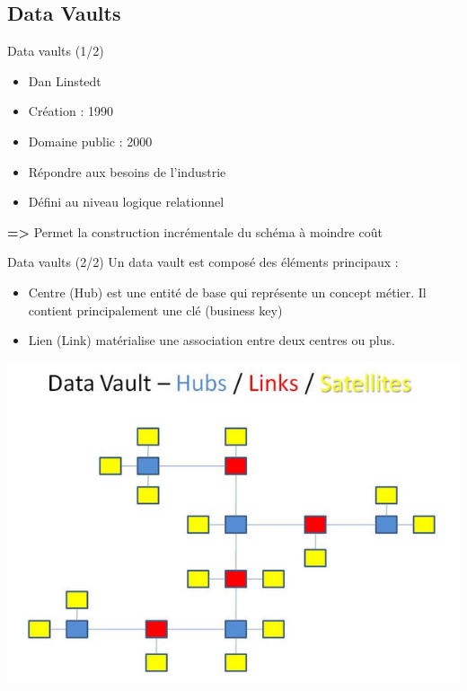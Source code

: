 \subsection{Data Vaults}
\begin{frame}{Data vaults (1/2)}
\begin{itemize}
    \item Dan Linstedt
    \item Création : 1990
    \item Domaine public : 2000
    \item Répondre aux besoins de l’industrie
    \item Défini au niveau logique relationnel
\end{itemize}
\vspace{0.1cm}
\textbf{=> }Permet la construction incrémentale du schéma à moindre coût \\
\end{frame}
\begin{frame}{Data vaults (2/2)}
Un data vault est composé des éléments principaux : 
\begin{itemize}
    \item Centre (Hub) est une entité de base qui représente un concept métier. Il contient principalement une clé (business key)
    \item Lien (Link) matérialise une association entre deux centres ou plus.
\end{itemize}
\centering
\includegraphics[scale=0.3]{figures/vault2.jpeg}
\end{frame}

